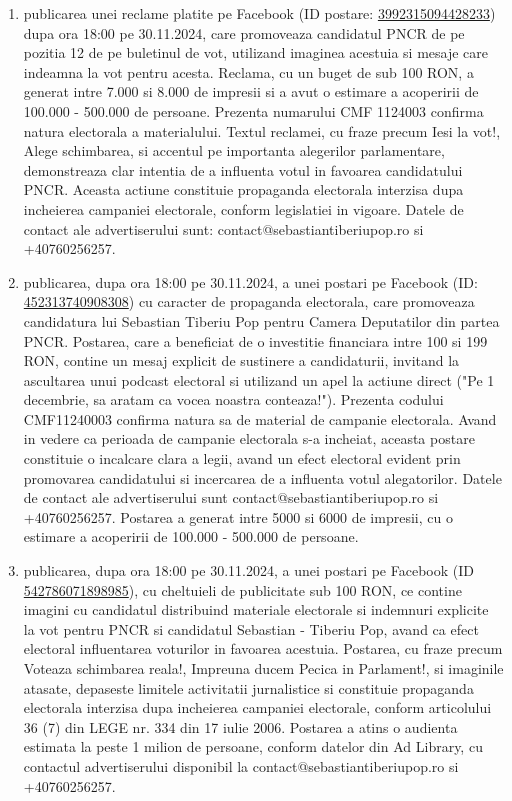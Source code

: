 \documentclass[a4paper,12pt]{article}
\begin{document}
\begin{enumerate}[leftmargin=*, label=\arabic*.)]
    \item publicarea unei reclame platite pe Facebook (ID postare: \href{https://www.facebook.com/ads/library/?id=3992315094428233}{3992315094428233}) dupa ora 18:00 pe 30.11.2024, care promoveaza candidatul PNCR de pe pozitia 12 de pe buletinul de vot, utilizand imaginea acestuia si mesaje care indeamna la vot pentru acesta. Reclama, cu un buget de sub 100 RON, a generat intre 7.000 si 8.000 de impresii si a avut o estimare a acoperirii de 100.000 - 500.000 de persoane.  Prezenta numarului CMF 1124003 confirma natura electorala a materialului.  Textul reclamei, cu fraze precum Iesi la vot!, Alege schimbarea, si accentul pe importanta alegerilor parlamentare, demonstreaza clar intentia de a influenta votul in favoarea candidatului PNCR.  Aceasta actiune constituie propaganda electorala interzisa dupa incheierea campaniei electorale, conform legislatiei in vigoare.  Datele de contact ale advertiserului sunt: contact@sebastiantiberiupop.ro si +40760256257.
    \item publicarea, dupa ora 18:00 pe 30.11.2024, a unei postari pe Facebook (ID: \href{https://www.facebook.com/ads/library/?id=452313740908308}{452313740908308}) cu caracter de propaganda electorala, care promoveaza candidatura lui Sebastian Tiberiu Pop pentru Camera Deputatilor din partea PNCR. Postarea, care a beneficiat de o investitie financiara intre 100 si 199 RON,  contine un mesaj explicit de sustinere a candidaturii, invitand la ascultarea unui podcast electoral si utilizand un apel la actiune direct ("Pe 1 decembrie, sa aratam ca vocea noastra conteaza!"). Prezenta codului CMF11240003 confirma natura sa de material de campanie electorala.  Avand in vedere ca perioada de campanie electorala s-a incheiat, aceasta postare constituie o incalcare clara a legii, avand un efect electoral evident prin promovarea candidatului si incercarea de a influenta votul alegatorilor.  Datele de contact ale advertiserului sunt contact@sebastiantiberiupop.ro si +40760256257. Postarea a generat intre 5000 si 6000 de impresii, cu o estimare a acoperirii de 100.000 - 500.000 de persoane.
    \item publicarea, dupa ora 18:00 pe 30.11.2024, a unei postari pe Facebook (ID \href{https://www.facebook.com/ads/library/?id=542786071898985}{542786071898985}), cu cheltuieli de publicitate sub 100 RON, ce contine imagini cu candidatul distribuind materiale electorale si indemnuri explicite la vot pentru PNCR si candidatul Sebastian - Tiberiu Pop, avand ca efect electoral influentarea voturilor in favoarea acestuia.  Postarea, cu fraze precum Voteaza schimbarea reala!, Impreuna ducem Pecica in Parlament!, si imaginile atasate, depaseste limitele activitatii jurnalistice si constituie propaganda electorala interzisa dupa incheierea campaniei electorale, conform articolului 36 (7) din LEGE nr. 334 din 17 iulie 2006.  Postarea a atins o audienta estimata la peste 1 milion de persoane, conform datelor din Ad Library, cu contactul advertiserului disponibil la contact@sebastiantiberiupop.ro si +40760256257.

\end{enumerate}
\end{document}
